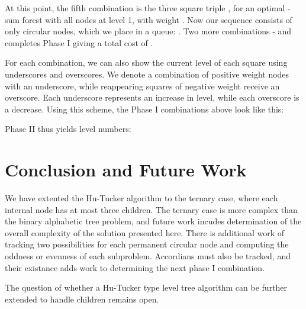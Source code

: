 \documentclass[12pt]{article}
\begin{document}
\noindent At this point, the fifth combination is the three square triple , 
for an optimal -sum forest with all nodes at level 1, with weight 
. Now our sequence consists of only circular nodes, which 
we place in a queue: . Two more combinations - 
 and  completes Phase I giving a total cost
of . 

For each combination, we can also show the current level of each square using 
underscores and overscores. We denote a combination of positive 
weight nodes with an underscore, while reappearing squares of negative weight 
receive an overscore. Each underscore represents an increase in level, while each 
overscore is a decrease. Using this scheme, the Phase I combinations above look
like this:













\vspace{.15in}
\noindent Phase II thus yields level numbers:


\section{Conclusion and Future Work}

We have extented the Hu-Tucker algorithm to the ternary case, where each
internal node has at most three children.  The ternary case is more complex than
the binary alphabetic tree problem, and future work incudes determination of the 
overall complexity of the solution presented here. There is additional work of 
tracking two possibilities for each permanent circular node and computing the 
oddness or evenness of each subproblem. Accordians must also be tracked, 
and their existance adds work to determining the next phase I combination.

The question of whether a Hu-Tucker type level tree algorithm can be further 
extended to handle  children remains open.



\end{document}
